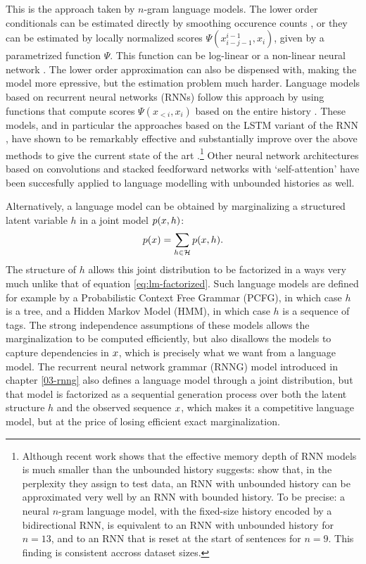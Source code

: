    This is the approach taken by $n$-gram language models. The lower order conditionals can be estimated directly by smoothing occurence counts \citep{chen1999empirical,kneser1995improved}, or they can be estimated by locally normalized scores $\Psi(x_{i-j-1}^{i-1}, x_i)$, given by a parametrized function $\Psi$. This function can be log-linear or a non-linear neural network \citep{rosenfeld1996loglinear,bengio2003neural}. The lower order approximation can also be dispensed with, making the model more epressive, but the estimation problem much harder. Language models based on recurrent neural networks (RNNs) follow this approach by using functions that compute scores $\Psi(x_{<i}, x_i)$ based on the entire history \citep{mikolov2010recurrent}. These models, and in particular the approaches based on the LSTM variant of the RNN \citep{hochreiter1997long}, have shown to be remarkably effective and substantially improve over the above methods to give the current state of the art \citep{zaremba2014recurrent,jozefowicz2016exploring,melis2017state}.\footnote{Although recent work shows that the effective memory depth of RNN models is much smaller than the unbounded history suggests: \citet{chelba2017n} show that, in the perplexity they assign to test data, an RNN with unbounded history can be approximated very well by an RNN with bounded history. To be precise: a neural $n$-gram language model, with the fixed-size history encoded by a bidirectional RNN, is equivalent to an RNN with unbounded history for $n=13$, and to an RNN that is reset at the start of sentences for $n=9$. This finding is consistent accross dataset sizes.} Other neural network architectures based on convolutions \citep{kalchbrenner2014convolutional} and stacked feedforward networks with `self-attention' \citep{vaswani2017attention} have been succesfully applied to language modelling with unbounded histories as well.

    Alternatively, a language model can be obtained by marginalizing a structured latent variable $h$ in a joint model $p(x, h)$:
    \begin{align}
      \label{eq:lm-latent}
      p( x ) = \sum_{h \in \mathcal{H}} p(x, h).
    \end{align}
    The structure of $h$ allows this joint distribution to be factorized in a ways very much unlike that of equation \ref{eq:lm-factorized}. Such language models are defined for example by a Probabilistic Context Free Grammar (PCFG), in which case $h$ is a tree, and a Hidden Markov Model (HMM), in which case $h$ is a sequence of tags. The strong independence assumptions of these models allows the marginalization to be computed efficiently, but also disallows the models to capture dependencies in $x$, which is precisely what we want from a language model. The recurrent neural network grammar (RNNG) model introduced in chapter \ref{03-rnng} also defines a language model through a joint distribution, but that model is factorized as a sequential generation process over both the latent structure $h$ and the observed sequence $x$, which makes it a competitive language model, but at the price of losing efficient exact marginalization.

